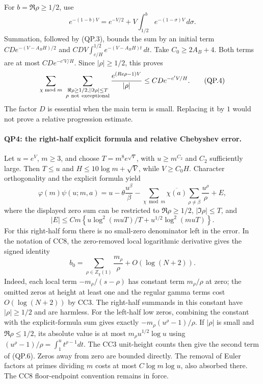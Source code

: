 For $b=\Re\rho\ge1/2$, use
\[
 e^{-(1-b)V}=e^{-V/2}+V\int_{1/2}^{b}e^{-(1-\sigma)V}\,d\sigma.
\]
Summation, followed by (QP.3), bounds the sum by an initial term
$CD e^{-(V-A_BH)/2}$ and
$CDV\int_{c/H}^{1/2}e^{-(V-A_BH)t}\,dt$.
Take $C_0\ge2A_B+4$.  Both terms are at most
$CD e^{-c'V/H}$.  Since $|\rho|\ge1/2$, this proves
\[
 \sum_{\chi\bmod m}\ \sum_{\substack{\Re\rho\ge1/2, |\Im\rho|\le T\cr
                                    \rho\ {\rm not\ exceptional}}}
       \frac{e^{(Re\rho-1)V}}{|\rho|}
             \le C D e^{-c'V/H}.                       \tag{QP.4}
\]
The factor $D$ is essential when the main term is small.  Replacing it
by $1$ would not prove a relative progression estimate.

\paragraph{QP4: the right-half explicit formula and relative Chebyshev error.}
Let $u=e^V$, $m\ge3$, and choose
$T=m^8e^{\sqrt V}$, with $u\ge m^{C_2}$ and $C_2$ sufficiently large.
Then $T\le u$ and $H\le10\log m+\sqrt V$, while $V\ge C_0H$.
Character orthogonality and the explicit formula yield
\[
 \varphi(m)\psi(u;m,a)
 =u-\theta\frac{u^\beta}{\beta}
   -\sum_{\chi\bmod m}\overline{\chi(a)}
      \sum_{\rho\ne\beta}\frac{u^\rho}{\rho}+E,         \tag{QP.5}
\]
where the displayed zero sum can be restricted to
$\Re\rho\ge1/2$, $|\Im\rho|\le T$, and
\[
 |E|\le C m\left\{u\log^2(muT)/T+
                              u^{1/2}\log^2(muT)\right\}.\tag{QP.6}
\]
For this right-half form there is no small-zero denominator left in the
error.  In the notation of CC8, the zero-removed local logarithmic
derivative gives the signed identity
\[
 b_0=\sum_{\rho\in Z_\chi(1)}\frac{m_\rho}{\rho}
                         +O(\log(N+2)).
\]
Indeed, each local term $-m_\rho/(s-\rho)$ has constant term
$m_\rho/\rho$ at zero; the omitted zeros at height at least one and
the regular gamma terms cost $O(\log(N+2))$ by CC3.
The right-half summands in this constant have $|\rho|\ge1/2$ and
are harmless.  For the left-half low zeros, combining the constant
with the explicit-formula sum gives exactly
$-m_\rho(u^\rho-1)/\rho$.  If $|\rho|$ is small and $\Re\rho\le1/2$, its
absolute value is at most $m_\rho u^{1/2}\log u$ using
$(u^\rho-1)/\rho=\int_1^u t^{\rho-1}dt$.
The CC3 unit-height counts then give the second term of (QP.6).
Zeros away from zero are bounded directly.  The removal of Euler factors
at primes dividing $m$ costs at most $C\log m\log u$, also absorbed there.
The CC8 floor-endpoint convention remains in force.

